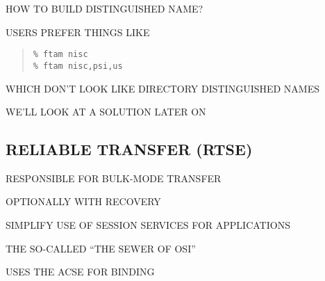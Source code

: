 \begin{bwslide}

\begin{nrtc}
\item	HOW TO BUILD DISTINGUISHED NAME?

\item	USERS PREFER THINGS LIKE
\begin{quote}\small\begin{verbatim}
% ftam nisc
% ftam nisc,psi,us
\end{verbatim}\end{quote}

\item	WHICH DON'T LOOK LIKE DIRECTORY DISTINGUISHED NAMES

\item	WE'LL LOOK AT A SOLUTION LATER ON
\end{nrtc}
\end{bwslide}


\begin{bwslide}
\part*	{RELIABLE TRANSFER (RTSE)}\bf

\begin{nrtc}
\item	RESPONSIBLE FOR BULK-MODE TRANSFER
    \begin{nrtc}
    \item	OPTIONALLY WITH RECOVERY
    \end{nrtc}

\item	SIMPLIFY USE OF SESSION SERVICES FOR APPLICATIONS
    \begin{nrtc}
    \item	THE SO-CALLED ``THE SEWER OF OSI''
    \end{nrtc}

\item	USES THE ACSE FOR BINDING
\end{nrtc}
\end{bwslide}




